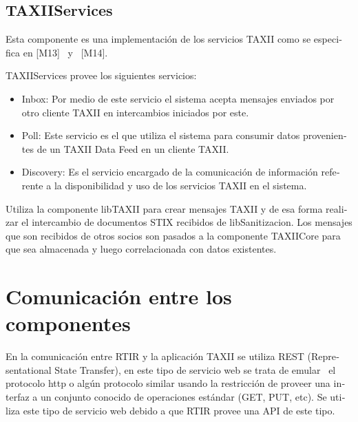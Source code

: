 \documentclass[11pt]{article}
\begin{document}
\subsection[TAXIIServices]{\foreignlanguage{spanish}{TAXIIServices}}
\foreignlanguage{spanish}{Esta componente es una implementación de los servicios TAXII como se especifica en [M13] \ y
\ [M14]. }

\foreignlanguage{spanish}{TAXIIServices provee los siguientes servicios:}

\begin{itemize}
\item \foreignlanguage{spanish}{Inbox: Por medio de este servicio el sistema acepta mensajes enviados por otro cliente
TAXII en intercambios iniciados por este. }
\item \foreignlanguage{spanish}{Poll: Este servicio es el que utiliza el sistema para consumir datos provenientes de un
TAXII Data Feed en un cliente TAXII.}
\item \foreignlanguage{spanish}{Discovery: Es el servicio encargado de la comunicación de información referente a la
disponibilidad y uso de los servicios TAXII en el sistema.}
\end{itemize}

\bigskip

\foreignlanguage{spanish}{Utiliza la componente libTAXII para crear mensajes TAXII y de esa forma realizar el
intercambio de documentos STIX recibidos de libSanitizacion. Los mensajes que son recibidos de otros socios son pasados
a la componente TAXIICore para que sea almacenada y luego correlacionada con datos existentes. }


\bigskip

\section[Comunicación entre los componentes]{\foreignlanguage{spanish}{Comunicación entre los componentes}}

\bigskip

\foreignlanguage{spanish}{En la comunicación entre RTIR y la aplicación TAXII se utiliza REST (Representational State
Transfer), en este tipo de servicio web se trata de emular \ el protocolo http o algún protocolo similar usando la
restricción de proveer una interfaz a un conjunto conocido de operaciones estándar (GET, PUT, etc). Se utiliza este
tipo de servicio web debido a que RTIR provee una API de este tipo. }


\bigskip
\end{document}
